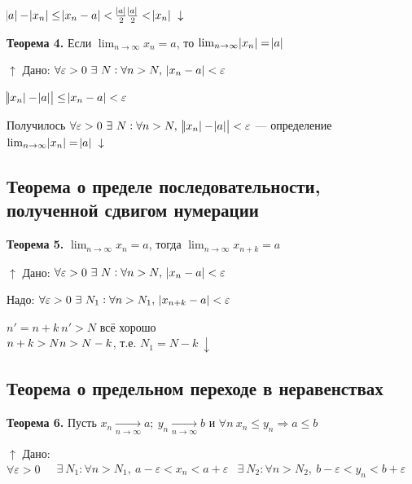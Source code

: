 \documentclass{article}
\begin{document}
    \(\abs{a} - \abs{x_n} \leq \abs{x_n - a} < \frac{\abs{a}}{2}\\ \frac{\abs{a}}{2} < \abs{x_n}\ \downarrow\)
    
    \textbf{Теорема 4.} Если \(\lim_{n \rightarrow \infty}{x_n} = a\), то \(\lim_{n \rightarrow \infty}{\abs{x_n}} = \abs{a}\)
    
    \(\uparrow\) Дано: \(\forall \varepsilon > 0\ \exists\ N : \forall n > N,\ \abs{x_n - a} < \varepsilon\)
    
    \(\abs{\abs{x_n} - \abs{a}} \leq \abs{x_n - a} < \varepsilon\)
    
    Получилось \(\forall \varepsilon > 0\ \exists\ N : \forall n > N,\ \abs{\abs{x_n} - \abs{a}} < \varepsilon\) --- определение \(\lim_{n \rightarrow \infty}{\abs{x_n}} = \abs{a}\ \downarrow\)

    \subsection{Теорема о пределе последовательности, полученной сдвигом нумерации}
    
    \textbf{Теорема 5.} \(\lim_{n \rightarrow \infty}{x_n} = a\), тогда \(\lim_{n \rightarrow \infty}{x_{n+k}} = a\)
    
    \(\uparrow\) Дано: \(\forall \varepsilon > 0\ \exists\ N : \forall n > N,\ \abs{x_n - a} < \varepsilon\)
    
    Надо: \(\forall \varepsilon > 0\ \exists\ N_1 : \forall n > N_1,\ \abs{x_{n+k} - a} < \varepsilon\)
    
    \(n' = n + k\ n' > N\) всё хорошо
    \\ \(n + k > N\\ n > N - k\), т.е. \(N_1 = N - k\ \downarrow\)
    
    \subsection{Теорема о предельном переходе в неравенствах}
    
    \textbf{Теорема 6.} Пусть \(x_n \xrightarrow[n \rightarrow \infty]{} a;\ y_n \xrightarrow[n \rightarrow \infty]{} b\) и \(\forall n\ x_n \leq y_n \Rightarrow a \leq b\)
    
    \(\uparrow\) Дано: \(\forall \varepsilon > 0\ \begin{aligned}
    	&\exists\ N_1 : \forall n > N_1,\ a - \varepsilon < x_n < a + \varepsilon
        &\exists\ N_2 : \forall n > N_2,\ b - \varepsilon < y_n < b + \varepsilon
        \end{aligned}\)
    
\end{document}

